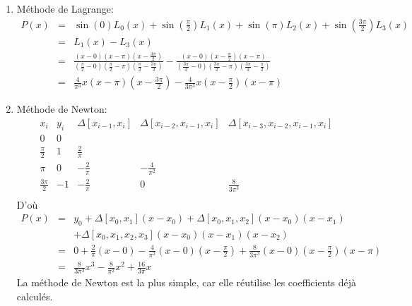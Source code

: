 \documentclass[a4paper]{article}
\begin{document}
\begin{enumerate}
\begin{enumerate}
\item Méthode de Lagrange: 
\[\begin{array}{ccl}
P(x)&=&\sin(0) L_0(x)+\sin(\frac{\pi}{2})L_1(x)+\sin(\pi)L_2(x)+\sin(\frac{3\pi}{2})L_3(x)\\
&=&L_1(x)-L_3(x)\\
&=&\frac{(x-0)(x-\pi)(x-\frac{3\pi}{2})}{(\frac{\pi}{2}-0)(\frac{\pi}{2}-\pi)(\frac{\pi}{2}-\frac{3\pi}{2})}-\frac{(x-0)(x-\frac{\pi}{2})(x-\pi)}{(\frac{3\pi}{2}-0)(\frac{3\pi}{2}-\pi)(\frac{3\pi}{2}-\frac{\pi}{2})}\\
&=&\frac{4}{\pi^3}x(x-\pi)(x-\frac{3\pi}{2})-\frac{4}{3\pi^3}x(x-\frac{\pi}{2})(x-\pi)
\end{array}
\]
\item Méthode de Newton: 
\[\begin{array}{cc|ccc}\hline
x_i&y_i&\Delta[x_{i-1},x_i]&\Delta[x_{i-2},x_{i-1},x_i] &\Delta[x_{i-3},x_{i-2},x_{i-1},x_i]\\ \hline\hline
0&\boxed{0}&&& \\
\frac{\pi}{2}&1&\boxed{\frac{2}{\pi}}&& \\
\pi&0&-\frac{2}{\pi}&\boxed{-\frac{4}{\pi^2}}&\\
\frac{3\pi}{2}&-1&-\frac{2}{\pi}&0&\boxed{\frac{8}{3\pi^3}}\\
\end{array}
\]
D'où
\[\begin{array}{ccl}
P(x)&=&y_0+\Delta[x_0,x_1](x-x_0)+\Delta[x_0,x_1,x_2](x-x_0)(x-x_1)\\
&&+\Delta[x_0,x_1,x_2,x_3](x-x_0)(x-x_1)(x-x_2)\\
&=&0+\frac{2}{\pi}(x-0)-\frac{4}{\pi^2}(x-0)(x-\frac{\pi}{2})+\frac{8}{3\pi^3}(x-0)(x-\frac{\pi}{2})(x-\pi)\\
&=&\frac{8}{3\pi^3}x^3-\frac{8}{\pi^2}x^2+\frac{16}{3\pi}x
\end{array}
\]
La méthode de Newton est la plus simple, car elle réutilise les coefficients déjà calculés.


\end{enumerate}
\end{enumerate}
\end{document}
